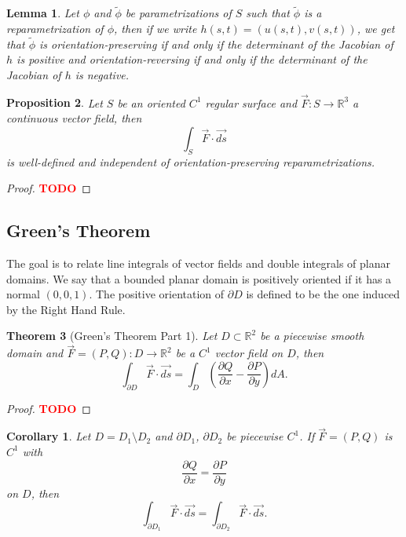 \documentclass{article}
\theoremstyle{plain}
\newtheorem{theorem}{Theorem}[subsection]
\newtheorem{proposition}[theorem]{Proposition}
\newtheorem{lemma}[theorem]{Lemma}
\newtheorem*{corollary}{Corollary}
\theoremstyle{definition}
\newcommand{\R}{\mathbb{R}}
\newcommand{\td}{\textcolor{red}{\textbf{TODO}}}
\begin{document}
\begin{lemma}
    Let $\phi$ and $\tilde\phi$ be parametrizations of $S$ such that $\tilde\phi$ is a reparametrization of $\phi$, then if we write $h(s,t) = (u(s,t), v(s,t))$, we get that $\tilde\phi$ is orientation-preserving if and only if the determinant of the Jacobian of $h$ is positive and orientation-reversing if and only if the determinant of the Jacobian of $h$ is negative.
\end{lemma}

\begin{proposition}
    Let $S$ be an oriented $C^1$ regular surface and $\vec{F}: S \to \R^3$ a continuous vector field, then
    $$\int_S \vec{F} \cdot \vec{ds}$$
    is well-defined and independent of orientation-preserving reparametrizations.
\end{proposition}

\begin{proof}
    \td  
\end{proof}

\subsection{Green's Theorem}

The goal is to relate line integrals of vector fields and double integrals of planar domains. We say that a bounded planar domain is positively oriented if it has a normal $(0,0,1)$. The positive orientation of $\partial D$ is defined to be the one induced by the Right Hand Rule.

\begin{theorem}[Green's Theorem Part 1]
    Let $D \subset \R^2$ be a piecewise smooth domain and $\vec{F} = (P, Q) : D \to \R^2$ be a $C^1$ vector field on $D$, then
    $$\int_{\partial D}\vec{F}\cdot \vec{ds} = \int_D \left(\frac{\partial Q}{\partial x} - \frac{\partial P}{\partial y}\right)dA.$$
\end{theorem}

\begin{proof}
    \td     
\end{proof}

\begin{corollary}
    Let $D = D_1 \setminus D_2$ and $\partial D_1$, $\partial D_2$ be piecewise $C^1$. If $\vec{F} = (P, Q)$ is $C^1$ with
    $$\frac{\partial Q}{\partial x} = \frac{\partial P}{\partial y}$$
    on $D$, then
    $$\int_{\partial D_1}\vec{F}\cdot \vec{ds} = \int_{\partial D_2}\vec{F}\cdot \vec{ds}.$$
\end{corollary}
\end{document}
